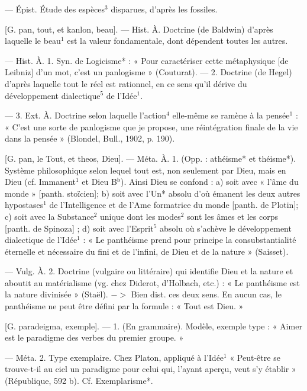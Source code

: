 	\begin{itemize}[leftmargin=1cm, label=, itemsep=1pt]
 — Épist. Étude des
espèces$^3$ disparues, d'après les fossiles.

 [G. pan, tout, et kanlon,
beau]. — Hist. À. Doctrine (de
Baldwin) d’après laquelle le beau$^1$
est la valeur fondamentale, dont
dépendent toutes les autres.

 — Hist. À. 1. Syn. de
Logicisme* : « Pour caractériser cette
métaphysique [de Leibniz] d’un mot,
c’est un panlogisme » (Couturat). —
2. Doctrine (de Hegel) d’après laquelle tout le réel est rationnel, en
ce sens qu'il dérive du développement dialectique$^5$ de l’Idée$^1$.

— 3. Ext. À. Doctrine selon laquelle l’action$^4$ elle-même se ramène
à la pensée$^1$ : « C’est une sorte de
panlogisme que je propose, une
réintégration finale de la vie dans
la pensée » (Blondel, Bull., 1902,
p. 190).

 [G. pan, le Tout, et theos,
Dieu]. — Méta. À. 1. (Opp. : athéisme* et théisme*). Système philosophique selon lequel tout est, non
seulement par Dieu, mais en Dieu
(cf. Immanent$^1$ et Dieu B$^\text{b}$). Ainsi
Dieu se confond : a) soit avec « l'âme
du monde » [panth. stoïcien]; b) soit
avec l’Un* absolu d’où émanent les
deux autres hypostases$^1$ de l’Intelligence et de l’Ame formatrice du
monde [panth. de Plotin]; c) soit
avec la Substance$^2$ unique dont les
modes$^2$ sont les âmes et les corps
[panth. de Spinoza] ; d) soit avec
l'Esprit$^5$ absolu où s'achève le développement dialectique de l’Idée$^1$ :
« Le panthéisme prend pour principe la consubstantialité éternelle et
nécessaire du fini et de l'infini, de
Dieu et de la nature » (Saisset).

— Vulg. À. 2. Doctrine (vulgaire
ou littéraire) qui identifie Dieu et la
nature et aboutit au matérialisme
(vg. chez Diderot, d'Holbach, etc.) :
« Le panthéisme est la nature divinisée » (Staël). $->$ Bien dist. ces
deux sens. En aucun cas, le panthéisme ne peut être défini par la
formule : « Tout est Dieu. »

 [G. paradeigma, exemple].
— 1. (En grammaire). Modèle,
exemple type : « Aimer est le paradigme des verbes du premier
groupe. »

— Méta. 2. Type exemplaire.
Chez Platon, appliqué à l’Idée$^1$
« Peut-être se trouve-t-il au ciel un
paradigme pour celui qui, l'ayant
aperçu, veut s'y établir » (République, 592 b). Cf. Exemplarisme*.


\end{itemize}
